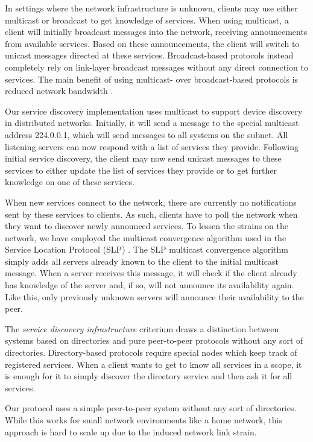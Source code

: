 In settings where the network infrastructure is unknown, clients may use either multicast or broadcast to get knowledge of services.
When using multicast, a client will initially broadcast messages into the network, receiving announcements from available services.
Based on these announcements, the client will switch to unicast messages directed at these services.
Broadcast-based protocols instead completely rely on link-layer broadcast messages without any direct connection to services.
The main benefit of using multicast- over broadcast-based protocols is reduced network bandwidth \cite{zhu2005service,edwards2006discovery}.

Our service discovery implementation uses multicast to support device discovery in distributed networks.
Initially, it will send a message to the special multicast address 224.0.0.1, which will send messages to all systems on the subnet.
All listening servers can now respond with a list of services they provide.
Following initial service discovery, the client may now send unicast messages to these services to either update the list of services they provide or to get further knowledge on one of these services.

When new services connect to the network, there are currently no notifications sent by these services to clients.
As such, clients have to poll the network when they want to discover newly announced services.
To lessen the strains on the network, we have employed the multicast convergence algorithm used in the Service Location Protocol (SLP) \cite{guttman1999service}.
The SLP multicast convergence algorithm simply adds all servers already known to the client to the initial multicast message.
When a server receives this message, it will check if the client already has knowledge of the server and, if so, will not announce its availability again.
Like this, only previously unknown servers will announce their availability to the peer.

The \emph{service discovery infrastructure} criterium draws a distinction between systems based on directories and pure peer-to-peer protocols without any sort of directories.
Directory-based protocols require special nodes which keep track of registered services.
When a client wants to get to know all services in a scope, it is enough for it to simply discover the directory service and then ask it for all services.

Our protocol uses a simple peer-to-peer system without any sort of directories.
While this works for small network environments like a home network, this approach is hard to scale up due to the induced network link strain.

